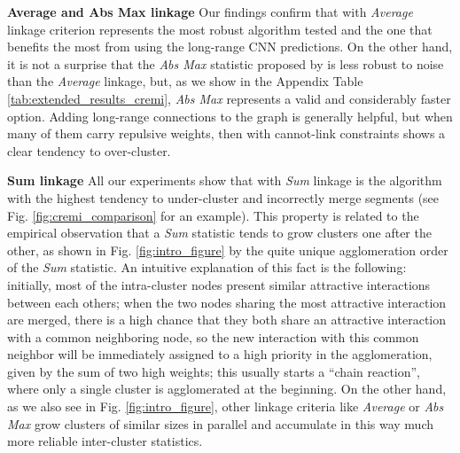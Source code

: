 \textbf{Average and Abs Max linkage } Our findings confirm that \algname{} with \emph{Average} linkage criterion represents the most robust algorithm tested and the one that benefits the most from using the long-range CNN predictions. On the other hand, it is not a surprise that the \emph{Abs Max} statistic proposed by \cite{wolf2018mutex} is less robust to noise than the \emph{Average} linkage, but, as we show in the Appendix Table \ref{tab:extended_results_cremi}, \emph{Abs Max} represents a valid and considerably faster option. 
Adding long-range connections to the graph is generally helpful, but when many of them carry repulsive weights, then \algname{} with cannot-link constraints shows a clear tendency to over-cluster.    

\textbf{Sum linkage } 
All our experiments show that \algname{} with \emph{Sum} linkage is the algorithm with the highest tendency to under-cluster and incorrectly merge segments (see Fig. \ref{fig:cremi_comparison} for an example). This property is related to the empirical observation that a \emph{Sum} statistic tends to grow clusters one after the other, as shown in Fig. \ref{fig:intro_figure} by the quite unique agglomeration order of the \emph{Sum} statistic. An intuitive explanation of this fact is the following: initially, most of the intra-cluster nodes present similar attractive interactions between each others; when the two nodes sharing the most attractive interaction are merged, there is a high chance that they both share an attractive interaction with a common neighboring node, so the new interaction with this common neighbor will be immediately assigned to a high priority in the agglomeration, given by the sum of two high weights; this usually starts a ``chain reaction'', where only a single cluster is agglomerated at the beginning. On the other hand, as we also see in Fig. \ref{fig:intro_figure}, other linkage criteria like \emph{Average} or \emph{Abs Max} grow clusters of similar sizes in parallel and accumulate in this way much more reliable inter-cluster statistics.






